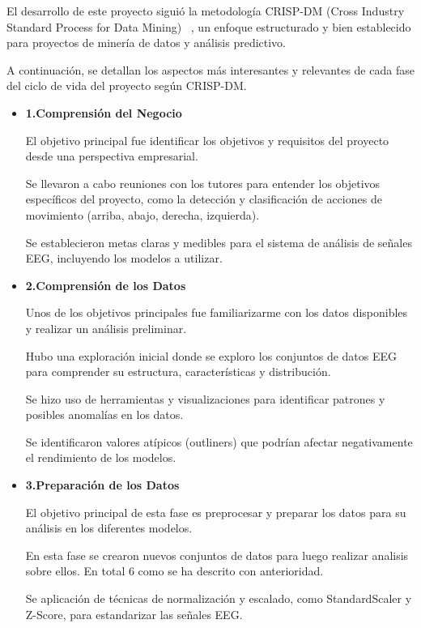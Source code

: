 

El desarrollo de este proyecto siguió la metodología CRISP-DM (Cross Industry Standard Process for Data Mining) ~\cite{wiki:CRISP}, un enfoque estructurado y bien establecido para proyectos de minería de datos y análisis predictivo. 

A continuación, se detallan los aspectos más interesantes y relevantes de cada fase del ciclo de vida del proyecto según CRISP-DM.


\begin{itemize}
	
\item
\textbf{1.Comprensión del Negocio}

El objetivo principal fue identificar los objetivos y requisitos del proyecto desde una perspectiva empresarial.

Se llevaron a cabo reuniones con los tutores para entender los objetivos específicos del proyecto, como la detección y clasificación de acciones de movimiento (arriba, abajo, derecha, izquierda).

Se establecieron metas claras y medibles para el sistema de análisis de señales EEG, incluyendo los modelos a utilizar.


\item
\textbf{2.Comprensión de los Datos}

Unos de los objetivos principales fue familiarizarme con los datos disponibles y realizar un análisis preliminar.

Hubo una exploración inicial donde se exploro los conjuntos de datos EEG para comprender su estructura, características y distribución.

Se hizo uso de herramientas y visualizaciones para identificar patrones y posibles anomalías en los datos.

Se identificaron valores atípicos (outliners) que podrían afectar negativamente el rendimiento de los modelos.


\item
\textbf{3.Preparación de los Datos}

El objetivo principal de esta fase es preprocesar y preparar los datos para su análisis en los diferentes modelos.

En esta fase se crearon nuevos conjuntos de datos para luego realizar analisis sobre ellos. En total 6 como se ha descrito con anterioridad.

Se aplicación de técnicas de normalización y escalado, como StandardScaler y Z-Score, para estandarizar las señales EEG.


\end{itemize}
